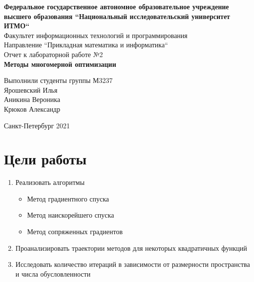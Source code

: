\documentclass[english]{article}
\date{}
\title{}
\begin{document}
\begin{titlepage}
    \begin{center}
        \large\textbf{Федеральное государственное автономное образовательное учреждение высшего образования ``Национальный исследовательский университет ИТМО``} \\
        \vspace{0.5cm}
        Факультет информационных технологий и программирования \\
        \vspace{0.5cm}
        Направление ``Прикладная математика и информатика`` \\
        \vspace{3cm}
        Отчет к лабораторной работе №2 \\
        \vspace{0.5cm}
        \textbf{Методы многомерной оптимизации}
    \end{center}
    \vfill
    \begin{flushright}
        \large
        Выполнили студенты группы М3237 \\
        \vspace{0.5cm}
        Ярошевский Илья \\
        Аникина Вероника \\
    Крюков Александр
    \end{flushright}
    \vspace{3cm}
    \begin{center}
        Санкт-Петербург 2021
    \end{center}
\end{titlepage}

\section{Цели работы}

\begin{enumerate}
    \item Реализовать алгоритмы
    \begin{itemize}
        \item Метод градиентного спуска
        \item Метод наискорейшего спуска
        \item Метод сопряженных градиентов
    \end{itemize}
    \item Проанализировать траектории методов для некоторых квадратичных функций
    \item Исследовать количество итераций в зависимости от размерности пространства и числа обусловленности
\end{enumerate}
\end{document}
